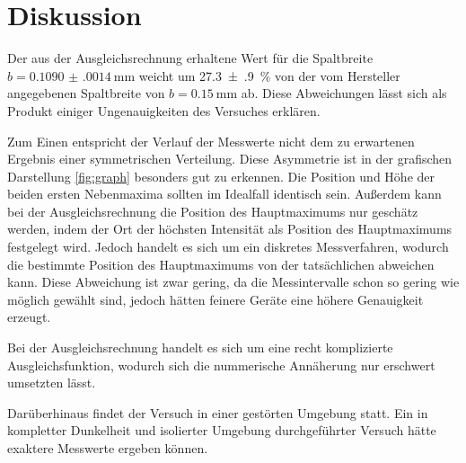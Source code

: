 \section{Diskussion}
\label{sec:Diskussion}
Der aus der Ausgleichsrechnung erhaltene Wert für die Spaltbreite $b = \SI{0.1090(0014)}{\milli\meter}$ weicht um \SI{27.3(9)}{\percent} von der vom Hersteller angegebenen Spaltbreite von $b = \SI{0.15}{\milli\meter}$ ab. Diese Abweichungen lässt sich als Produkt einiger Ungenauigkeiten des Versuches erklären. 

Zum Einen entspricht der Verlauf der Messwerte nicht dem zu erwartenen Ergebnis einer symmetrischen Verteilung. Diese Asymmetrie ist in der grafischen Darstellung \ref{fig:graph} besonders gut zu erkennen. Die Position und Höhe der beiden ersten Nebenmaxima sollten im Idealfall identisch sein. Außerdem kann bei der Ausgleichsrechnung die Position des Hauptmaximums nur geschätz werden, indem der Ort der höchsten Intensität als Position des Hauptmaximums festgelegt wird. Jedoch handelt es sich um ein diskretes Messverfahren, wodurch die bestimmte Position des Hauptmaximums von der tatsächlichen abweichen kann. Diese Abweichung ist zwar gering, da die Messintervalle schon so gering wie möglich gewählt sind, jedoch hätten feinere Geräte eine höhere Genauigkeit erzeugt. 

Bei der Ausgleichsrechnung handelt es sich um eine recht komplizierte Ausgleichsfunktion, wodurch sich die nummerische Annäherung nur erschwert umsetzten lässt. 

Darüberhinaus findet der Versuch in einer gestörten Umgebung statt. Ein in kompletter Dunkelheit und isolierter Umgebung durchgeführter Versuch hätte exaktere Messwerte ergeben können.


